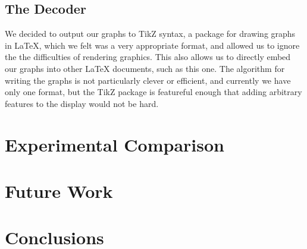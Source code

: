 \documentclass{article}
\begin{document}
\subsection{The Decoder}
We decided to output our graphs to TikZ syntax, a package for drawing graphs in LaTeX, which we felt was a very appropriate format, and allowed us to ignore the 
the difficulties of rendering graphics. This also allows us to directly embed our graphs into other LaTeX documents, such as this one. The algorithm for 
writing the graphs is not particularly clever or efficient, and currently we have only one format, but the TikZ package is featureful enough that adding arbitrary
features to the display would not be hard.


\section{Experimental Comparison}


\section{Future Work}


\section{Conclusions}



\end{document}
